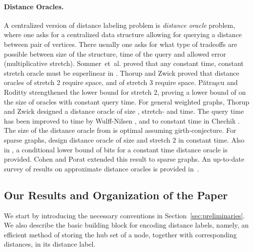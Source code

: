 \documentclass{article}[11pt,letter]
\newcommand{\etal}{{et~al.}\xspace}
\begin{document}
\paragraph{Distance Oracles.}

A centralized version of distance labeling problem is \emph{distance oracle} problem, where one asks for a centralized data structure allowing for querying a distance between pair of vertices. There usually one asks for what type of tradeoffs are possible between size of the structure, time of the query and allowed error (multiplicative stretch). Sommer~\etal \cite{sommer2009distance} proved that any constant time, constant stretch oracle must be superlinear in . Thorup and Zwick \cite{Thorup:2001:CRS:378580.378581} proved that distance oracles of stretch 2 require  space, and of stretch 3 require  space. Pătraşcu and Roditty \cite{PatrascuR14} strengthened the lower bound for stretch 2, proving a lower bound of  on the size of oracles with constant query time. For general weighted graphs, Thorup and Zwick \cite{Thorup:2001:CRS:378580.378581} designed a distance oracle of size , stretch- and  time. The query time has been improved to  time by Wulff-Nilsen \cite{doi:10.1137/1.9781611973105.39}, and to constant time in Chechik \cite{Chechik:2014:ADO:2591796.2591801}. The size of the distance oracle from \cite{Thorup:2001:CRS:378580.378581} is optimal assuming girth-conjecture. For sparse graphs, \cite{PatrascuR14} design distance oracle of size  and stretch 2 in constant time. Also in \cite{PatrascuR14}, a conditional lower bound of  bits for a constant time distance oracle is provided. Cohen and Porat \cite{DBLP:journals/corr/abs-1006-1117} extended this result to sparse graphs.  An up-to-date survey of results on approximate distance oracles is provided in~\cite{DBLP:reference/algo/Roditty15a}.

\subsection{Our Results and Organization of the Paper}\label{sec:our_results}

We start by introducing the necessary conventions in Section~\ref{sec:preliminaries}. We also describe the basic building block for encoding distance labels, namely, an efficient method of storing the hub set of a node, together with corresponding distances, in its distance label.
\end{document}
